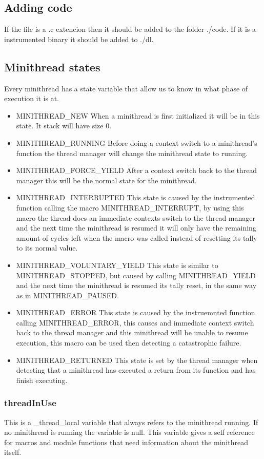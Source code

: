 \documentclass[12pt,a4paper]{report}
\begin{document}
\subsection{Adding code}
If the file is a .c extencion then it should be added to the folder ./code.
If it is a instrumented binary it should be added to ./dl.

\subsection{Minithread states}
Every minithread has a state variable that allow us to know in what phase of execution it is at.
\begin{itemize}
    \item MINITHREAD\_NEW
    When a minithread is first initialized it will be in this state. It stack will have size 0.
    \item MINITHREAD\_RUNNING
    Before doing a context switch to a minithread's function the thread manager will change the minithread state to running.
    \item MINITHREAD\_FORCE\_YIELD
    After a context switch back to the thread manager this will be the normal state for the minithread.
    \item MINITHREAD\_INTERRUPTED
    This state is caused by the instrumented function calling the macro MINITHREAD\_INTERRUPT, by using this macro the thread does an immediate contexts switch to the thread manager and the next time the minithread is resumed it will only have the remaining amount of cycles left when the macro was called instead of resetting its tally to its normal value.
    \item MINITHREAD\_VOLUNTARY\_YIELD
    This state is similar to MINITHREAD\_STOPPED, but caused by calling MINITHREAD\_YIELD and the next time the minithread is resumed its tally reset, in the same way as in MINITHREAD\_PAUSED.
    \item MINITHREAD\_ERROR
    This state is caused by the instruemnted function calling MINITHREAD\_ERROR, this causes and immediate context switch back to the thread manager and this minithread will be unable to resume execution, this macro can be used then detecting a catastrophic failure.
    \item MINITHREAD\_RETURNED
    This state is set by the thread manager when detecting that a minithread has executed a return from its function and has finish executing. 
\end{itemize}

\subsubsection{threadInUse}\label{thread in use}
This is a \_thread\_local variable that always refers to the minithread running. If no minithread is running the variable is null.
This variable gives a self reference for macros and module functions that need information about the minithread itself. 
\end{document}
